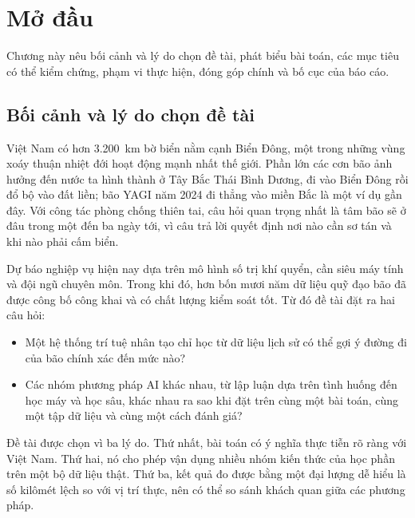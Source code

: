 \chapter{Mở đầu}
\label{ch:modau}

\begin{muctieu}
Chương này nêu bối cảnh và lý do chọn đề tài, phát biểu bài toán, các mục
tiêu có thể kiểm chứng, phạm vi thực hiện, đóng góp chính và bố cục của báo
cáo.
\end{muctieu}

\section{Bối cảnh và lý do chọn đề tài}

Việt Nam có hơn 3.200~km bờ biển nằm cạnh Biển Đông, một trong những vùng
xoáy thuận nhiệt đới hoạt động mạnh nhất thế giới. Phần lớn các cơn bão ảnh
hưởng đến nước ta hình thành ở Tây Bắc Thái Bình Dương, đi vào Biển Đông rồi
đổ bộ vào đất liền; bão YAGI năm 2024 đi thẳng vào miền Bắc là một ví dụ gần
đây. Với công tác phòng chống thiên tai, câu hỏi quan trọng nhất là tâm bão
sẽ ở đâu trong một đến ba ngày tới, vì câu trả lời quyết định nơi nào cần sơ
tán và khi nào phải cấm biển.

Dự báo nghiệp vụ hiện nay dựa trên mô hình số trị khí quyển, cần siêu máy
tính và đội ngũ chuyên môn. Trong khi đó, hơn bốn mươi năm dữ liệu quỹ đạo
bão đã được công bố công khai và có chất lượng kiểm soát tốt. Từ đó đề tài
đặt ra hai câu hỏi:
\begin{itemize}[leftmargin=1.6em, itemsep=2pt]
  \item Một hệ thống trí tuệ nhân tạo chỉ học từ dữ liệu lịch sử có thể gợi ý
        đường đi của bão chính xác đến mức nào?
  \item Các nhóm phương pháp AI khác nhau, từ lập luận dựa trên tình huống
        đến học máy và học sâu, khác nhau ra sao khi đặt trên cùng một bài
        toán, cùng một tập dữ liệu và cùng một cách đánh giá?
\end{itemize}

Đề tài được chọn vì ba lý do. Thứ nhất, bài toán có ý nghĩa thực tiễn rõ
ràng với Việt Nam. Thứ hai, nó cho phép vận dụng nhiều nhóm kiến thức của
học phần trên một bộ dữ liệu thật. Thứ ba, kết quả đo được bằng một đại
lượng dễ hiểu là số kilômét lệch so với vị trí thực, nên có thể so sánh
khách quan giữa các phương pháp.

